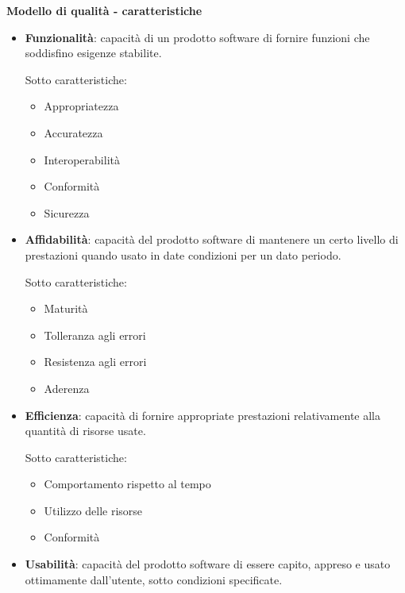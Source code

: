 		\textbf{Modello di qualità - caratteristiche}
		
		\begin{itemize}
		
			\item \textbf{Funzionalità}: capacità di un prodotto software di fornire funzioni che soddisfino esigenze stabilite.
			
			Sotto caratteristiche:
			
			\begin{itemize}
			
				\item Appropriatezza
				\item Accuratezza
				\item Interoperabilità
				\item Conformità
				\item Sicurezza

			\end{itemize}

		\item \textbf{Affidabilità}: capacità del prodotto software di mantenere un certo livello di prestazioni quando usato in date condizioni per un dato periodo.
		
			Sotto caratteristiche:
			
			\begin{itemize}
			
				\item Maturità
				\item Tolleranza agli errori
				\item Resistenza agli errori
				\item Aderenza

			\end{itemize}

		\item \textbf{Efficienza}: capacità di fornire appropriate prestazioni relativamente alla quantità di risorse usate.
		
			Sotto caratteristiche:
			
			\begin{itemize}
			
				\item Comportamento rispetto al tempo
				\item Utilizzo delle risorse
				\item Conformità
				
			\end{itemize}

		\item \textbf{Usabilità}: capacità del prodotto software di essere capito, appreso e usato ottimamente dall'utente, sotto condizioni specificate.
		

\end{itemize}

